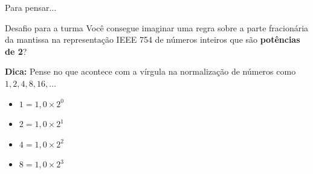 \begin{frame}{Para pensar...}
    \begin{alertblock}{Desafio para a turma}
        Você consegue imaginar uma regra sobre a parte fracionária da mantissa na representação IEEE 754 de números inteiros que são \textbf{potências de 2}?
    \end{alertblock}

    \vspace{0.5cm}
    \textbf{Dica:} Pense no que acontece com a vírgula na normalização de números como $1, 2, 4, 8, 16, \dots$

    \begin{itemize}
        \item $1 = 1,0 \times 2^0$
        \item $2 = 1,0 \times 2^1$
        \item $4 = 1,0 \times 2^2$
        \item $8 = 1,0 \times 2^3$
    \end{itemize}
\end{frame}